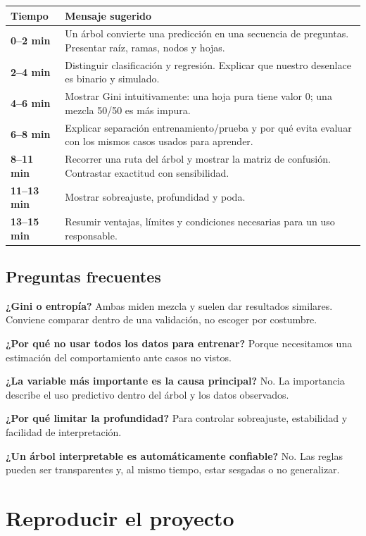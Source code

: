 \documentclass[11pt,oneside,openany]{book}
\begin{document}
\begin{tabularx}{\textwidth}{>{\bfseries}p{1.8cm}X}
\toprule
Tiempo & Mensaje sugerido \\
\midrule
0--2 min & Un árbol convierte una predicción en una secuencia de preguntas. Presentar raíz, ramas, nodos y hojas. \\
2--4 min & Distinguir clasificación y regresión. Explicar que nuestro desenlace es binario y simulado. \\
4--6 min & Mostrar Gini intuitivamente: una hoja pura tiene valor 0; una mezcla 50/50 es más impura. \\
6--8 min & Explicar separación entrenamiento/prueba y por qué evita evaluar con los mismos casos usados para aprender. \\
8--11 min & Recorrer una ruta del árbol y mostrar la matriz de confusión. Contrastar exactitud con sensibilidad. \\
11--13 min & Mostrar sobreajuste, profundidad y poda. \\
13--15 min & Resumir ventajas, límites y condiciones necesarias para un uso responsable. \\
\bottomrule
\end{tabularx}

\section{Preguntas frecuentes}

\textbf{¿Gini o entropía?} Ambas miden mezcla y suelen dar resultados similares.
Conviene comparar dentro de una validación, no escoger por costumbre.

\textbf{¿Por qué no usar todos los datos para entrenar?} Porque necesitamos una
estimación del comportamiento ante casos no vistos.

\textbf{¿La variable más importante es la causa principal?} No. La importancia
describe el uso predictivo dentro del árbol y los datos observados.

\textbf{¿Por qué limitar la profundidad?} Para controlar sobreajuste, estabilidad
y facilidad de interpretación.

\textbf{¿Un árbol interpretable es automáticamente confiable?} No. Las reglas
pueden ser transparentes y, al mismo tiempo, estar sesgadas o no generalizar.

\chapter{Reproducir el proyecto}
\end{document}
